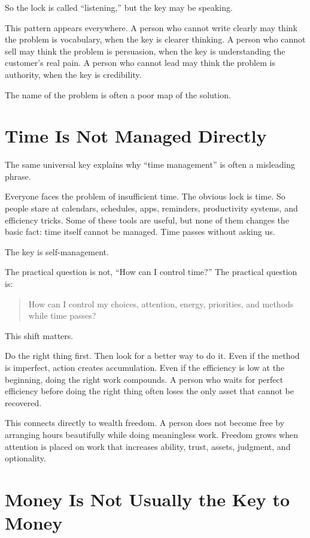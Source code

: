 So the lock is called ``listening,'' but the key may be speaking.

This pattern appears everywhere. A person who cannot write clearly may think the problem is vocabulary, when the key is clearer thinking. A person who cannot sell may think the problem is persuasion, when the key is understanding the customer's real pain. A person who cannot lead may think the problem is authority, when the key is credibility.

The name of the problem is often a poor map of the solution.

\section*{Time Is Not Managed Directly}

The same universal key explains why ``time management'' is often a misleading phrase.

Everyone faces the problem of insufficient time. The obvious lock is time. So people stare at calendars, schedules, apps, reminders, productivity systems, and efficiency tricks. Some of these tools are useful, but none of them changes the basic fact: time itself cannot be managed. Time passes without asking us.

The key is self-management.

The practical question is not, ``How can I control time?'' The practical question is:

\begin{quote}
How can I control my choices, attention, energy, priorities, and methods while time passes?
\end{quote}

This shift matters.

Do the right thing first. Then look for a better way to do it. Even if the method is imperfect, action creates accumulation. Even if the efficiency is low at the beginning, doing the right work compounds. A person who waits for perfect efficiency before doing the right thing often loses the only asset that cannot be recovered.

This connects directly to wealth freedom. A person does not become free by arranging hours beautifully while doing meaningless work. Freedom grows when attention is placed on work that increases ability, trust, assets, judgment, and optionality.

\section*{Money Is Not Usually the Key to Money}

